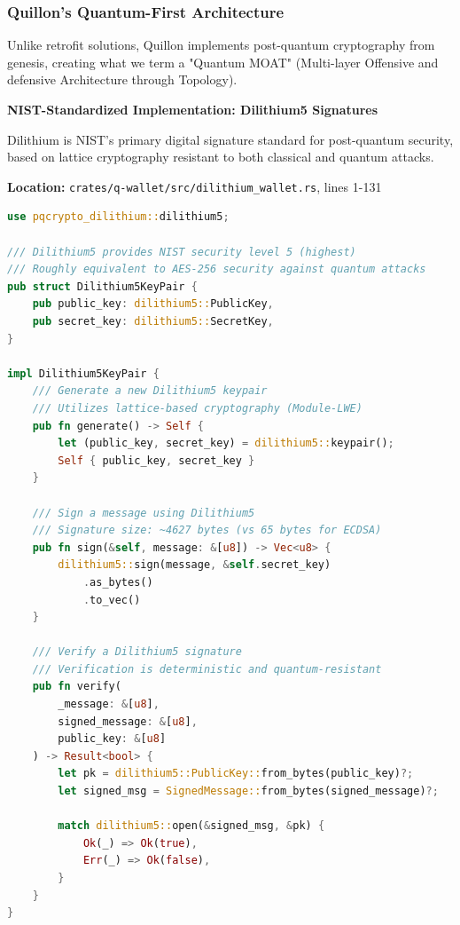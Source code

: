 \documentclass[11pt,a4paper]{article}
\begin{document}
\subsubsection{Quillon's Quantum-First Architecture}

Unlike retrofit solutions, Quillon implements post-quantum cryptography from genesis, creating what we term a "Quantum MOAT" (Multi-layer Offensive and defensive Architecture through Topology).

\textbf{NIST-Standardized Implementation: Dilithium5 Signatures}

Dilithium is NIST's primary digital signature standard for post-quantum security, based on lattice cryptography resistant to both classical and quantum attacks.

\textbf{Location:} \texttt{crates/q-wallet/src/dilithium\_wallet.rs}, lines 1-131

\begin{lstlisting}[language=Rust,caption={Dilithium5 Digital Signatures - NIST Level 5 Security}]
use pqcrypto_dilithium::dilithium5;

/// Dilithium5 provides NIST security level 5 (highest)
/// Roughly equivalent to AES-256 security against quantum attacks
pub struct Dilithium5KeyPair {
    pub public_key: dilithium5::PublicKey,
    pub secret_key: dilithium5::SecretKey,
}

impl Dilithium5KeyPair {
    /// Generate a new Dilithium5 keypair
    /// Utilizes lattice-based cryptography (Module-LWE)
    pub fn generate() -> Self {
        let (public_key, secret_key) = dilithium5::keypair();
        Self { public_key, secret_key }
    }

    /// Sign a message using Dilithium5
    /// Signature size: ~4627 bytes (vs 65 bytes for ECDSA)
    pub fn sign(&self, message: &[u8]) -> Vec<u8> {
        dilithium5::sign(message, &self.secret_key)
            .as_bytes()
            .to_vec()
    }

    /// Verify a Dilithium5 signature
    /// Verification is deterministic and quantum-resistant
    pub fn verify(
        _message: &[u8],
        signed_message: &[u8],
        public_key: &[u8]
    ) -> Result<bool> {
        let pk = dilithium5::PublicKey::from_bytes(public_key)?;
        let signed_msg = SignedMessage::from_bytes(signed_message)?;

        match dilithium5::open(&signed_msg, &pk) {
            Ok(_) => Ok(true),
            Err(_) => Ok(false),
        }
    }
}
\end{lstlisting}
\end{document}
